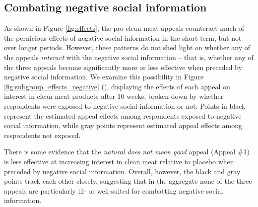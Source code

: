 \documentclass[12pt]{article}
\begin{document}




\subsection{Combating negative social information}

As shown in Figure \ref{fig:effects}, the pro-clean meat appeals counteract much of the pernicious effects of negative social information in the short-term, but not over longer periods. However, these patterns do not shed light on whether any of the appeals \textit{interact} with the negative social information -- that is, whether any of the three appeals become significantly more or less effective when preceded by negative social information. We examine this possibility in Figure \ref{fig:subgroup_effects_negative} (), displaying the effects of each appeal on interest in clean meat products after 10 weeks, broken down by whether respondents were exposed to negative social information or not. Points in black represent the estimated appeal effects among respondents exposed to negative social information, while gray points represent estimated appeal effects among respondents not exposed.

There is some evidence that the \textit{natural does not mean good} appeal (Appeal \#1) is less effective at increasing interest in clean meat relative to placebo when preceded by negative social information. Overall, however, the black and gray points track each other closely, suggesting that in the aggregate none of the three appeals are particularly ill- or well-suited for combatting negative social information.
\end{document}
